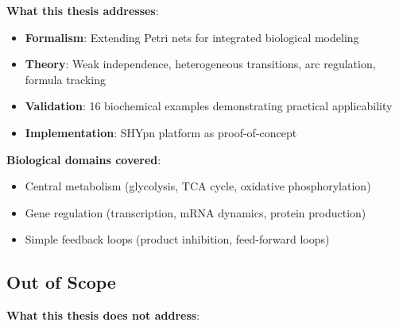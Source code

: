\textbf{What this thesis addresses}:

\begin{itemize}
    \item \textbf{Formalism}: Extending Petri nets for integrated biological modeling
    \item \textbf{Theory}: Weak independence, heterogeneous transitions, arc regulation, formula tracking
    \item \textbf{Validation}: 16 biochemical examples demonstrating practical applicability
    \item \textbf{Implementation}: SHYpn platform as proof-of-concept
\end{itemize}

\textbf{Biological domains covered}:

\begin{itemize}
    \item Central metabolism (glycolysis, TCA cycle, oxidative phosphorylation)
    \item Gene regulation (transcription, mRNA dynamics, protein production)
    \item Simple feedback loops (product inhibition, feed-forward loops)
\end{itemize}

\subsection{Out of Scope}
\label{subsec:out-of-scope}

\textbf{What this thesis does not address}:

